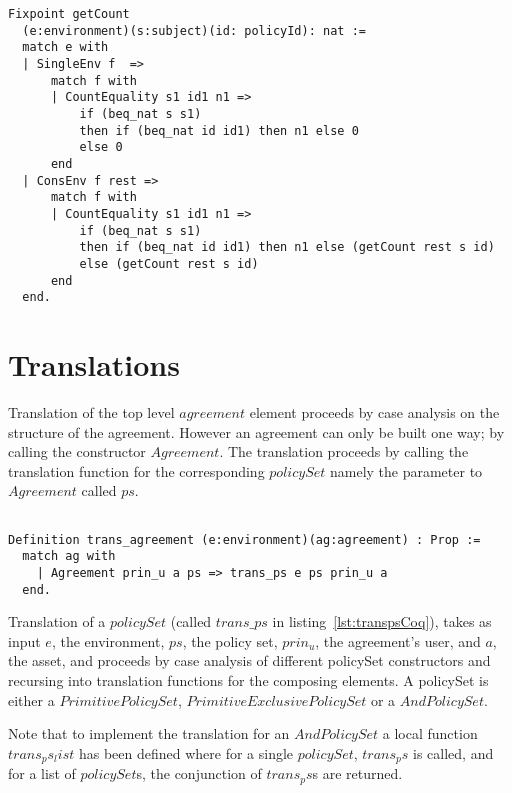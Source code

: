 \begin{minipage}[c]{0.95\textwidth}
\begin{lstlisting}
Fixpoint getCount 
  (e:environment)(s:subject)(id: policyId): nat :=
  match e with
  | SingleEnv f  => 
      match f with 
	  | CountEquality s1 id1 n1 => 
          if (beq_nat s s1) 
          then if (beq_nat id id1) then n1 else 0 
          else 0  
      end			
  | ConsEnv f rest =>
      match f with 
	  | CountEquality s1 id1 n1 => 
          if (beq_nat s s1)
          then if (beq_nat id id1) then n1 else (getCount rest s id)  
          else (getCount rest s id)
      end
  end.
\end{lstlisting}
\end{minipage}

\section{Translations}

Translation of the top level $agreement$ element proceeds by case analysis on the structure of the agreement. However an agreement can only be built one way; by calling the constructor $Agreement$. The translation proceeds by calling the translation function for the corresponding $policySet$ namely the parameter to $Agreement$ called $ps$.


\begin{lstlisting}

Definition trans_agreement (e:environment)(ag:agreement) : Prop :=
  match ag with 
    | Agreement prin_u a ps => trans_ps e ps prin_u a
  end.

\end{lstlisting}

Translation of a $policySet$ (called $trans\_ps$ in listing~\ref{lst:transpsCoq}), takes as input $e$, the environment, $ps$, the policy set, $prin_{u}$, the agreement's user, and $a$, the asset, and proceeds by case analysis of different policySet constructors and recursing into translation functions for the composing elements. A policySet is either a $PrimitivePolicySet$, $PrimitiveExclusivePolicySet$ or a $AndPolicySet$. 

Note that to implement the translation for an $AndPolicySet$ a local function $trans_ps_list$ has been defined where for a single $policySet$, $trans_ps$ is called, and for a list of $policySet$s, the conjunction of $trans_ps$s are returned.

